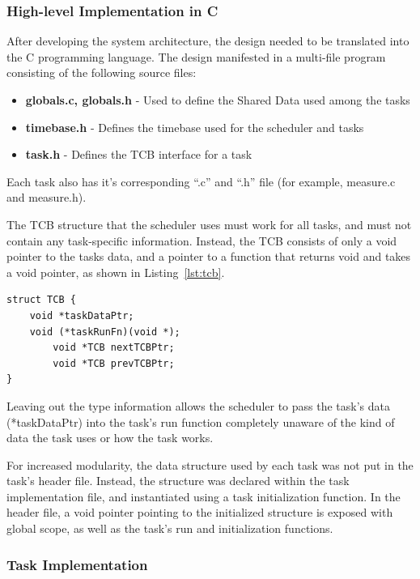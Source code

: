 \documentclass[12pt]{article} %
\begin{document}
    \subsubsection{High-level Implementation in C}
    After developing the system architecture, the design needed to be translated into the C programming language. The design manifested in a multi-file program consisting of the following source files:
    \begin{itemize}
      \item \textbf{globals.c, globals.h} - Used to define the Shared Data used among the tasks
      \item \textbf{timebase.h} - Defines the timebase used for the scheduler and tasks
      \item \textbf{task.h} - Defines the TCB interface for a task
    \end{itemize}
    Each task also has it's corresponding ``.c'' and ``.h'' file (for example, measure.c and measure.h).

    The TCB structure that the scheduler uses must work for all tasks, and must
    not contain any task-specific information. Instead, the TCB consists of
    only a void pointer to the tasks data, and a pointer to a function that
    returns void and takes a void pointer, as shown in Listing~\ref{lst:tcb}.
	
\begin{lstlisting}[caption=TCB Construct, captionpos=b, label=lst:tcb]
struct TCB {
    void *taskDataPtr;
    void (*taskRunFn)(void *);
		void *TCB nextTCBPtr;
		void *TCB prevTCBPtr;
}
\end{lstlisting}
    Leaving out the type information allows the scheduler to pass the task's data
    (*taskDataPtr) into the task's run function completely unaware of the kind of
    data the task uses or how the task works.

    For increased modularity, the data structure used by each task was not put in
    the task's header file. Instead, the structure was declared within the task
    implementation file, and instantiated using a task initialization function. In
    the header file, a void pointer pointing to the initialized structure is
    exposed with global scope, as well as the task's run and initialization functions.

    \subsubsection{Task Implementation}
\end{document}
